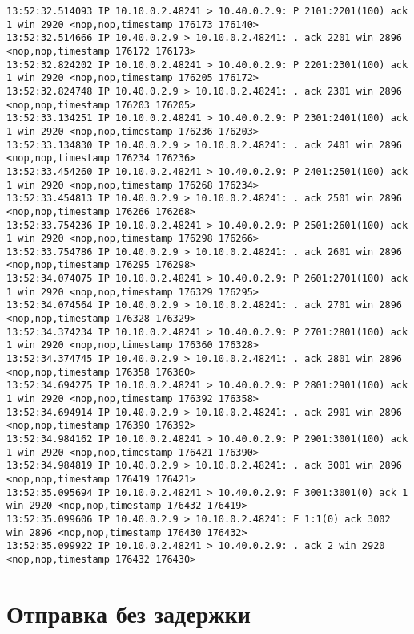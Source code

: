 \documentclass[a4paper,12pt]{article}
\begin{document}
\begin{lstlisting}
13:52:32.514093 IP 10.10.0.2.48241 > 10.40.0.2.9: P 2101:2201(100) ack 1 win 2920 <nop,nop,timestamp 176173 176140>
13:52:32.514666 IP 10.40.0.2.9 > 10.10.0.2.48241: . ack 2201 win 2896 <nop,nop,timestamp 176172 176173>
13:52:32.824202 IP 10.10.0.2.48241 > 10.40.0.2.9: P 2201:2301(100) ack 1 win 2920 <nop,nop,timestamp 176205 176172>
13:52:32.824748 IP 10.40.0.2.9 > 10.10.0.2.48241: . ack 2301 win 2896 <nop,nop,timestamp 176203 176205>
13:52:33.134251 IP 10.10.0.2.48241 > 10.40.0.2.9: P 2301:2401(100) ack 1 win 2920 <nop,nop,timestamp 176236 176203>
13:52:33.134830 IP 10.40.0.2.9 > 10.10.0.2.48241: . ack 2401 win 2896 <nop,nop,timestamp 176234 176236>
13:52:33.454260 IP 10.10.0.2.48241 > 10.40.0.2.9: P 2401:2501(100) ack 1 win 2920 <nop,nop,timestamp 176268 176234>
13:52:33.454813 IP 10.40.0.2.9 > 10.10.0.2.48241: . ack 2501 win 2896 <nop,nop,timestamp 176266 176268>
13:52:33.754236 IP 10.10.0.2.48241 > 10.40.0.2.9: P 2501:2601(100) ack 1 win 2920 <nop,nop,timestamp 176298 176266>
13:52:33.754786 IP 10.40.0.2.9 > 10.10.0.2.48241: . ack 2601 win 2896 <nop,nop,timestamp 176295 176298>
13:52:34.074075 IP 10.10.0.2.48241 > 10.40.0.2.9: P 2601:2701(100) ack 1 win 2920 <nop,nop,timestamp 176329 176295>
13:52:34.074564 IP 10.40.0.2.9 > 10.10.0.2.48241: . ack 2701 win 2896 <nop,nop,timestamp 176328 176329>
13:52:34.374234 IP 10.10.0.2.48241 > 10.40.0.2.9: P 2701:2801(100) ack 1 win 2920 <nop,nop,timestamp 176360 176328>
13:52:34.374745 IP 10.40.0.2.9 > 10.10.0.2.48241: . ack 2801 win 2896 <nop,nop,timestamp 176358 176360>
13:52:34.694275 IP 10.10.0.2.48241 > 10.40.0.2.9: P 2801:2901(100) ack 1 win 2920 <nop,nop,timestamp 176392 176358>
13:52:34.694914 IP 10.40.0.2.9 > 10.10.0.2.48241: . ack 2901 win 2896 <nop,nop,timestamp 176390 176392>
13:52:34.984162 IP 10.10.0.2.48241 > 10.40.0.2.9: P 2901:3001(100) ack 1 win 2920 <nop,nop,timestamp 176421 176390>
13:52:34.984819 IP 10.40.0.2.9 > 10.10.0.2.48241: . ack 3001 win 2896 <nop,nop,timestamp 176419 176421>
13:52:35.095694 IP 10.10.0.2.48241 > 10.40.0.2.9: F 3001:3001(0) ack 1 win 2920 <nop,nop,timestamp 176432 176419>
13:52:35.099606 IP 10.40.0.2.9 > 10.10.0.2.48241: F 1:1(0) ack 3002 win 2896 <nop,nop,timestamp 176430 176432>
13:52:35.099922 IP 10.10.0.2.48241 > 10.40.0.2.9: . ack 2 win 2920 <nop,nop,timestamp 176432 176430>
\end{lstlisting}

\section{Отправка без задержки}
\end{document}
